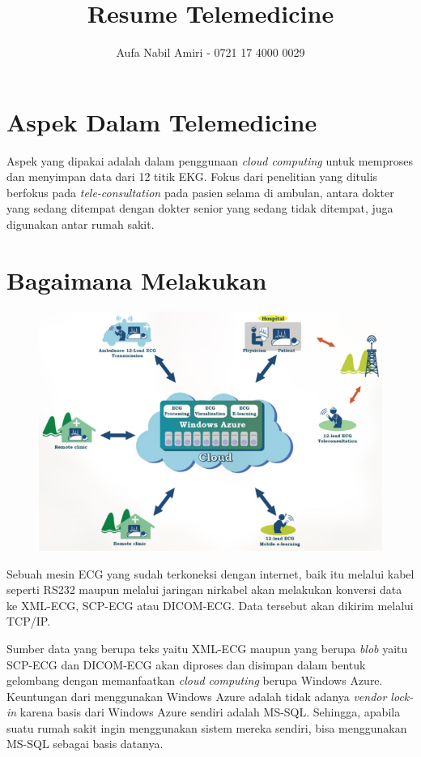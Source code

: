 \documentclass[12pt, a4paper]{article}
\title{Resume Telemedicine}
\author{Aufa Nabil Amiri - 0721 17 4000 0029}
\date{}
\makeatletter
\renewcommand{\maketitle}{
\bgroup\setlength{\parindent}{0pt}
\begin{flushleft}
  \LARGE\textbf{\@title}

  \normalsize\@author
\end{flushleft}\egroup
}
\makeatother
\begin{document}
\maketitle

\section*{Aspek Dalam Telemedicine}

Aspek yang dipakai adalah dalam penggunaan \textit{cloud computing} untuk memproses dan menyimpan data dari 12 titik EKG. Fokus dari penelitian yang ditulis berfokus pada \textit{tele-consultation} pada pasien selama di ambulan, antara dokter yang sedang ditempat dengan dokter senior yang sedang tidak ditempat, juga digunakan antar rumah sakit.

\section*{Bagaimana Melakukan}

\begin{figure}[h!]
    \begin{center}
        \includegraphics[width=\linewidth]{grafik2.png}
    \end{center}
\end{figure}

Sebuah mesin ECG yang sudah terkoneksi dengan internet, baik itu melalui kabel seperti RS232 maupun melalui jaringan nirkabel akan melakukan konversi data ke XML-ECG, SCP-ECG atau DICOM-ECG. Data tersebut akan dikirim melalui TCP/IP.

Sumber data yang berupa teks yaitu XML-ECG maupun yang berupa \textit{blob} yaitu SCP-ECG dan DICOM-ECG akan diproses dan disimpan dalam bentuk gelombang dengan memanfaatkan \textit{cloud computing} berupa Windows Azure. Keuntungan dari menggunakan Windows Azure adalah tidak adanya \textit{vendor lock-in} karena basis dari Windows Azure sendiri adalah MS-SQL. Sehingga, apabila suatu rumah sakit ingin menggunakan sistem mereka sendiri, bisa menggunakan MS-SQL sebagai basis datanya.
\end{document}
